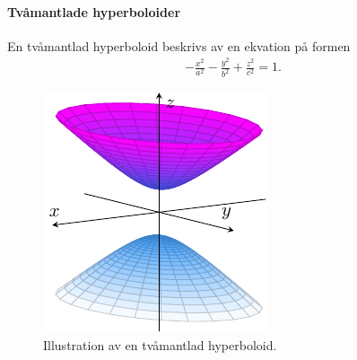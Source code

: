 \paragraph{Tvåmantlade hyperboloider}
En tvåmantlad hyperboloid beskrivs av en ekvation på formen
\begin{align*}
	-\frac{x^2}{a^2} - \frac{y^2}{b^2} + \frac{z^2}{c^2} = 1.
\end{align*}

\begin{figure}[!ht]
	\centering
	\includegraphics[scale=1]{./Images/quadric_surfaces/two_sheet_hyperboloid/two_sheet_hyperboloid.pdf}
	\caption{Illustration av en tvåmantlad hyperboloid.}
	\label{fig:two_sheet_hyperboloid}
\end{figure}